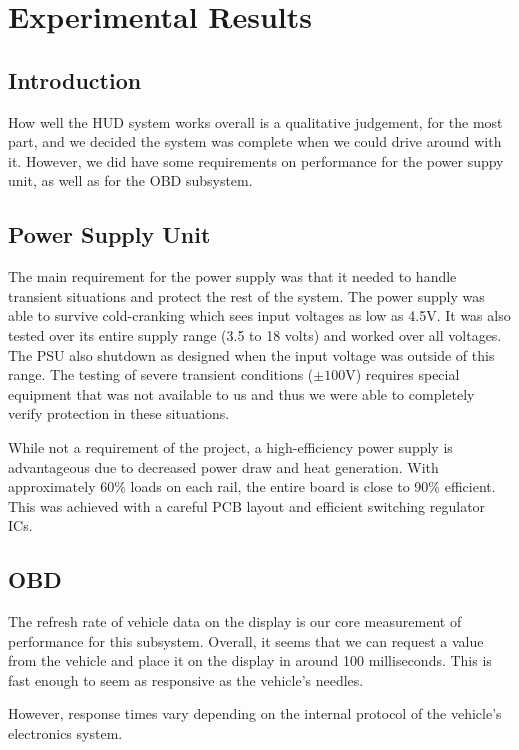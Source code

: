 \chapter{Experimental Results}


\section{Introduction}

How well the HUD system works overall is a qualitative judgement, for the most
part, and we decided the system was complete when we could drive around with it.
However, we did have some requirements on performance for the power suppy unit, as well
as for the OBD subsystem.

\section{Power Supply Unit}

The main requirement for the power supply was that it needed to handle transient 
situations and protect the rest of the system.  The power supply was able to survive
cold-cranking which sees input voltages as low as 4.5V.  It was also tested
over its entire supply range (3.5 to 18 volts) and worked over all voltages.  The PSU
also shutdown as designed when the input voltage was outside of this range.  The 
testing of severe transient conditions ($\pm 100$V) requires special equipment that was
not available to us and thus we were able to completely verify protection in these
situations.

While not a requirement of the project, a high-efficiency power supply is advantageous 
due to decreased power draw and heat generation.  With approximately 60\% loads on 
each rail, the entire board is close to 90\% efficient.  This was achieved with a 
careful PCB layout and efficient switching regulator ICs.

\section{OBD}

The refresh rate of vehicle data on the display is our core measurement of
performance for this subsystem. Overall, it seems that we can request a value
from the vehicle and place it on the display in around 100 milliseconds. This
is fast enough to seem as responsive as the vehicle's needles.

However, response times vary depending on the internal protocol of the vehicle's
electronics system.
